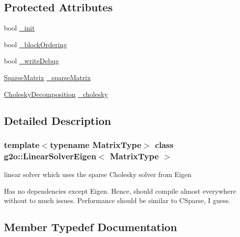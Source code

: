 \subsection*{Protected Attributes}
\begin{DoxyCompactItemize}
\item 
bool \mbox{\hyperlink{classg2o_1_1_linear_solver_eigen_a52c02e9b24e4f6ade190e6adb29b05b4}{\+\_\+init}}
\item 
bool \mbox{\hyperlink{classg2o_1_1_linear_solver_eigen_a041970f37a5a6e63778f0c40e7c6e948}{\+\_\+block\+Ordering}}
\item 
bool \mbox{\hyperlink{classg2o_1_1_linear_solver_eigen_a2d331575853451fc94ca6f6420f0bdcb}{\+\_\+write\+Debug}}
\item 
\mbox{\hyperlink{classg2o_1_1_linear_solver_eigen_aeb7e2400bed3a249b5f29ce7cc00cd33}{Sparse\+Matrix}} \mbox{\hyperlink{classg2o_1_1_linear_solver_eigen_a39682995a9cf32dc79848281c6d4d9b9}{\+\_\+sparse\+Matrix}}
\item 
\mbox{\hyperlink{classg2o_1_1_linear_solver_eigen_1_1_cholesky_decomposition}{Cholesky\+Decomposition}} \mbox{\hyperlink{classg2o_1_1_linear_solver_eigen_ab7205de4c6820b3ecd7ed7f39bbdf573}{\+\_\+cholesky}}
\end{DoxyCompactItemize}


\subsection{Detailed Description}
\subsubsection*{template$<$typename Matrix\+Type$>$\newline
class g2o\+::\+Linear\+Solver\+Eigen$<$ Matrix\+Type $>$}

linear solver which uses the sparse Cholesky solver from Eigen 

Has no dependencies except Eigen. Hence, should compile almost everywhere without to much issues. Performance should be similar to C\+Sparse, I guess. 

\subsection{Member Typedef Documentation}
\mbox{\label{classg2o_1_1_linear_solver_eigen_acd9dd4e15dfbbad2720f1b83519333e8}} 
